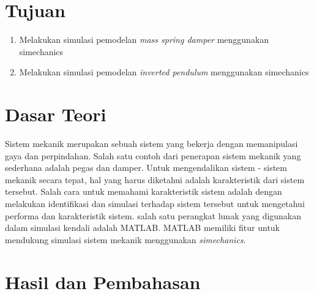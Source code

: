 \documentclass[../main.tex]{subfiles}
\begin{document}
    \section{Tujuan}
        \begin{enumerate}
            \item Melakukan simulasi pemodelan \textit{mass spring damper} menggunakan simechanics
            \item Melakukan simulasi pemodelan \textit{inverted pendulum} menggunakan simechanics
        \end{enumerate}
    \section{Dasar Teori}
        Sistem mekanik merupakan sebuah sistem yang bekerja dengan memanipulasi gaya dan perpindahan. Salah satu contoh dari penerapan sistem mekanik yang sederhana adalah pegas dan damper. Untuk mengendalikan sistem - sistem mekanik secara tepat, hal yang harus diketahui adalah karakteristik dari sistem tersebut. Salah cara untuk memahami karakteristik sistem adalah dengan melakukan identifikasi dan simulasi terhadap sistem tersebut untuk mengetahui performa dan karakteristik sistem\cite{Fahmizal}. salah satu perangkat lunak yang digunakan dalam simulasi kendali adalah MATLAB. MATLAB memiliki fitur untuk mendukung simulasi sistem mekanik menggunakan \textit{simechanics}.
    \section{Hasil dan Pembahasan}
\end{document}
